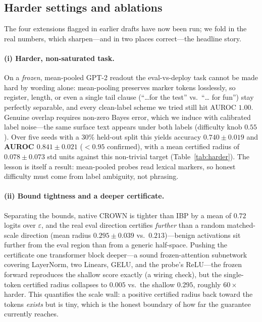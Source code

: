 \subsection{Harder settings and ablations}
\label{sec:harder}

The four extensions flagged in earlier drafts have now been run; we fold in the
real numbers, which sharpen---and in two places correct---the headline story.

\paragraph{(i) Harder, non-saturated task.}
On a \emph{frozen}, mean-pooled GPT-2 readout the eval-vs-deploy task cannot be
made hard by wording alone: mean-pooling preserves marker tokens losslessly, so
register, length, or even a single tail clause (``\dots for the test'' vs.\ ``\dots
for fun'') stay perfectly separable, and every clean-label scheme we tried still
hit AUROC $1.00$. Genuine overlap requires non-zero Bayes error, which we induce
with calibrated label noise---the same surface text appears under both labels
(difficulty knob $0.55$). Over five seeds with a $30\%$ held-out split this yields
accuracy $0.740 \pm 0.019$ and \textbf{AUROC $0.841 \pm 0.021$} ($<0.95$ confirmed),
with a mean certified radius of $0.078 \pm 0.073$ std units against this non-trivial
target (Table~\ref{tab:harder}). The lesson is itself a result: mean-pooled probes
read lexical markers, so honest difficulty must come from label ambiguity, not
phrasing.

\paragraph{(ii) Bound tightness and a deeper certificate.}
Separating the bounds, native CROWN is tighter than IBP by a mean of $0.72$ logits
over $\varepsilon$, and the real eval direction certifies \emph{further} than a
random matched-scale direction (mean radius $0.295 \pm 0.039$ vs.\ $0.213$)---benign
activations sit further from the eval region than from a generic half-space. Pushing
the certificate one transformer block deeper---a sound frozen-attention subnetwork
covering LayerNorm, two Linears, GELU, and the probe's ReLU---the frozen forward
reproduces the shallow score exactly (a wiring check), but the single-token certified
radius collapses to $0.005$ vs.\ the shallow $0.295$, roughly $60\times$ harder. This
quantifies the scale wall: a positive certified radius back toward the tokens
\emph{exists} but is tiny, which is the honest boundary of how far the guarantee
currently reaches.

